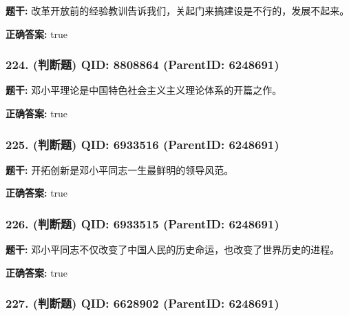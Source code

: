 \documentclass[12pt,UTF8]{ctexart}
\begin{document}
\textbf{题干:}
改革开放前的经验教训告诉我们，关起门来搞建设是不行的，发展不起来。



\textbf{正确答案:}
true

\vspace{0.3em}\hrulefill\vspace{0.7em}

\subsubsection*{224. (判断题) \small QID: 8808864 (ParentID: 6248691)}

\textbf{题干:}
邓小平理论是中国特色社会主义主义理论体系的开篇之作。



\textbf{正确答案:}
true

\vspace{0.3em}\hrulefill\vspace{0.7em}

\subsubsection*{225. (判断题) \small QID: 6933516 (ParentID: 6248691)}

\textbf{题干:}
开拓创新是邓小平同志一生最鲜明的领导风范。



\textbf{正确答案:}
true

\vspace{0.3em}\hrulefill\vspace{0.7em}

\subsubsection*{226. (判断题) \small QID: 6933515 (ParentID: 6248691)}

\textbf{题干:}
邓小平同志不仅改变了中国人民的历史命运，也改变了世界历史的进程。



\textbf{正确答案:}
true

\vspace{0.3em}\hrulefill\vspace{0.7em}

\subsubsection*{227. (判断题) \small QID: 6628902 (ParentID: 6248691)}
\end{document}
